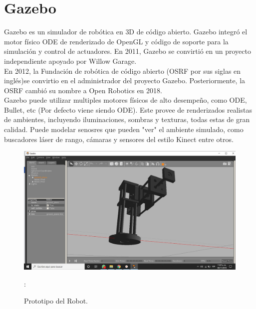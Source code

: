 \documentclass[11pt,a4paper,oldfontcommands,oneside]{memoir}
\begin{document}
\vspace{.5cm}
\hfill\break




\tableofcontents*

\clearpage



\chapter{Gazebo}
Gazebo es un simulador de robótica en 3D de código abierto. Gazebo integró el motor físico ODE de renderizado de OpenGL y código de soporte para la simulación y control de actuadores. En 2011, Gazebo se convirtió en un proyecto independiente apoyado por Willow Garage.\\
En 2012, la Fundación de robótica de código abierto (OSRF por sus siglas en inglés)se convirtio en el administrador del proyecto Gazebo. Posteriormente, la OSRF cambió su nombre a Open Robotics en 2018. \\ 
Gazebo puede utilizar multiples motores físicos de alto desempeño, como ODE, Bullet, etc (Por defecto viene siendo ODE). Este provee de renderizados realistas de ambientes, incluyendo iluminaciones, sombras y texturas, todas estas de gran calidad. Puede modelar senosres que pueden "ver" el ambiente simulado, como buscadores láser de rango, cámaras y sensores del estilo Kinect entre otros.

\begin{figure}
\begin{center}
\includegraphics[scale=.30]{101.png}
\end{center}
\caption{Prototipo del Robot.}
\label{blender}:
\end{figure}
\end{document}
